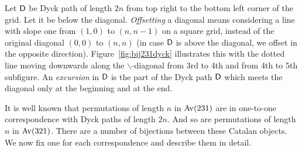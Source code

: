 \documentclass[12pt, a4paper, twoside]{report}
\begin{document}
Let $\textsf{D}$ be Dyck path of length $2n$ from top right to the bottom left corner of the grid. Let it be below the diagonal. \emph{Offsetting} a diagonal means considering a line with slope one from $(1,0)$ to $(n,n-1)$ on a square grid, instead of the original diagonal $(0,0)$ to $(n,n)$ (in case $\textsf{D}$ is above the diagonal, we offset in the opposite direction). Figure~\ref{fig:bij231dyck} illustrates this with the dotted line moving downwards along the $\backslash$-diagonal from 3rd to 4th and from 4th to 5th subfigure. An \emph{excursion} in $\textsf{D}$ is the part of the Dyck path $\textsf{D}$ which meets the diagonal only at the beginning and at the end.

It is well known that permutations of length $n$ in $\mathrm{Av}(231)$ are in one-to-one correspondence with Dyck paths of length $2n$. And so are permutations of length $n$ in $\mathrm{Av}(321)$. There are a number of bijections between these Catalan objects. We now fix one for each correspondence and describe them in detail.
\end{document}
